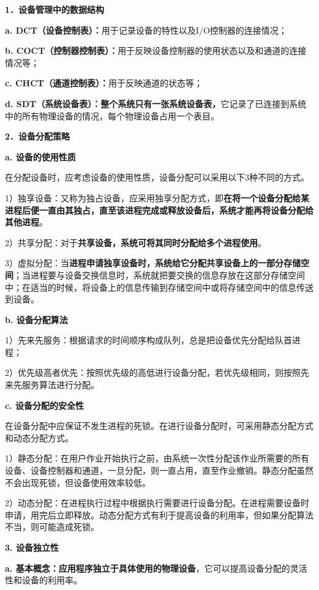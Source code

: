\textbf{{1．}{设备管理中的数据结构}}

\textbf{a.
DCT（设备控制表）：}{用于记录设备的特性以及I/O控制器的连接情况；}

\textbf{b.
COCT（控制器控制表）：}用于反映设备控制器的使用状态以及和通道的连接情况等；

\textbf{c. CHCT（通道控制表）：}用于反映通道的状态等；

\textbf{d.
SDT（系统设备表）：{整个系统只有一张}\textbf{系统设备表}，}它记录了已连接到系统中的所有物理设备的情况，每个物理设备占用一个表目。

\textbf{{2．设备分配策略}}

{\textbf{a. 设备的使用性质}}

在分配设备时，应考虑设备的使用性质，设备分配可以采用以下3种不同的方式。

{{1）独享设备：}又称为独占设备，应采用独享分配方式，即\textbf{在将一个设备分配给某进程后便一直由其独占，直至该进程完成或释放设备后，系统才能再将设备分配给其他进程}。}

{2）共享分配：}对于\textbf{共享设备，系统可将其同时分配给多个进程使用}。

{3）虚拟分配：}当\textbf{进程申请独享设备时，系统给它分配共享设备上的一部分存储空间}；当进程要与设备交换信息时，系统就把要交换的信息存放在这部分存储空间中；在适当的时候，将设备上的信息传输到存储空间中或将存储空间中的信息传送到设备。

{\textbf{b. 设备分配算法}}

{1）先来先服务：}根据请求的时间顺序构成队列，总是把设备优先分配给队首进程；

{2）优先级高者优先：}按照优先级的高低进行设备分配，若优先级相同，则按照先来先服务算法进行分配。

{\textbf{c. 设备分配的安全性}}{\textbf{}}

在设备分配中应保证不发生进程的死锁。{在进行设备分配时，可采用静态分配方式和动态分配方式。}

{1）}{静态分配：}在用户作业开始执行之前，由系统一次性分配该作业所需要的所有设备、设备控制器和通道，一旦分配，则一直占用，直至作业撤销。静态分配虽然不会出现死锁，但设备使用效率较低。

{2）动态分配：}在进程执行过程中根据执行需要进行设备分配。在进程需要设备时申请，用完后立即释放。动态分配方式有利于提高设备的利用率，但如果分配算法不当，则可能造成死锁。

\textbf{{3. 设备独立性}}

\textbf{a.
基本概念：应用程序独立于具体使用的物理设备}，它可以提高设备分配的灵活性和设备的利用率。


